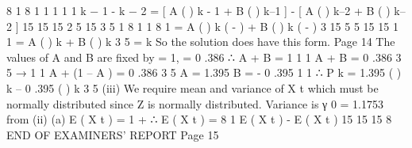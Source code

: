 8
1
8
1
1
1
1
1
\rho k − 1 -
\rho k − 2 =
[ A ( ) k - 1 + B ( ) k–1 ] -
[ A ( ) k–2 + B ( ) k–2 ]
15
15
15
2
5
15
3
5
1
8
1
1
8
1
= A ( ) k (
 - ) + B ( ) k (
 -
)
3
15
5
5
15
15
1
1
= A ( ) k + B ( ) k
3
5
= \rho k
So the solution does have this form.
Page 14%
The values of A and B are fixed by   = 1,  = 0 .386
∴ A + B = 1
1
1
A + B = 0 .386
3
5
→
1
1
A + (1 – A ) = 0 .386
3
5
A = 1.395
B = - 0 .395
1
1
∴ P k = 1.395 ( ) k – 0 .395 ( ) k
3
5
(iii)
We require mean and variance of X t which must be normally distributed
since Z is normally distributed.
Variance is γ 0  = 1.1753 from (ii) (a)
E ( X t ) = 1 +
∴ E ( X t ) =
8
1
E ( X t ) -
E ( X t )
15
15
15
8
END OF EXAMINERS’ REPORT
Page 15
